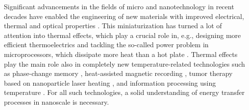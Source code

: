 

Significant advancements in the fields of micro and nanotechnology in recent decades have enabled the engineering of new materials with improved electrical, thermal and optical properties \cite{}. This miniaturization has turned a lot of attention into thermal effects, which play a crucial role in, e.g., designing more efficient thermoelectrics \cite{vineis10,kanatzidis10,shakouri11} and tackling the so-called power problem in microprocessors, which dissipate more heat than a hot plate \cite{pop06_ieee}. Thermal effects play the main role also in completely new temperature-related technologies such as phase-change memory \cite{lankhorst05}, heat-assisted magnetic recording \cite{pan09}, tumor therapy based on nanoparticle laser heating \cite{avedisian09}, and information processing using temperature \cite{li12_rmp}. For all such technologies, a solid understanding of energy transfer processes in nanoscale is necessary. %



